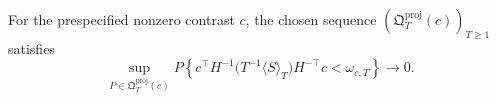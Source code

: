 For the prespecified nonzero contrast \(c\), the chosen sequence \((\mathfrak Q_T^{\mathrm{proj}}(c))_{T\ge1}\) satisfies
\[
 \sup_{P\in\mathfrak Q_T^{\mathrm{proj}}(c)}
 P\!\left\{
 c^\top H^{-1}\bigl(T^{-1}\langle S\rangle_T\bigr)H^{-\top}c<\omega_{c,T}
 \right\}\longrightarrow0.
\]